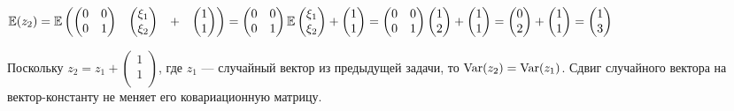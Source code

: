 \documentclass[pdftex,11pt,openany]{book}\usepackage[]{graphicx}\usepackage[]{color}
\begin{document}
\begin{solution}
$\mathbb{E} (z_2) = \mathbb{E}   \begin{pmatrix}
 \begin{pmatrix}
0 & 0 \\
0 & 1 \\
\end{pmatrix}  &  \begin{pmatrix}
\xi_1 \\
\xi_2 \\
\end{pmatrix}  & + &  \begin{pmatrix}
1\\
1\\
\end{pmatrix}  \\
\end{pmatrix}  =  \begin{pmatrix}
0 & 0 \\
0 & 1 \\
\end{pmatrix}  \mathbb{E}   \begin{pmatrix}
\xi_1 \\
\xi_2 \\
\end{pmatrix}  +  \begin{pmatrix}
1\\
1\\
\end{pmatrix}  =  \begin{pmatrix}
0 & 0 \\
0 & 1 \\
\end{pmatrix}   \begin{pmatrix}
1\\
2\\
\end{pmatrix}  +  \begin{pmatrix}
1\\
1\\
\end{pmatrix}  =  \begin{pmatrix}
0\\
2\\
\end{pmatrix} +  \begin{pmatrix}
1\\
1\\
\end{pmatrix}  =  \begin{pmatrix}
1\\
3\\
\end{pmatrix} $

Поскольку $z_2 = z_1 +  \begin{pmatrix}
1\\
1\\
\end{pmatrix} $, где $z_1$ --- случайный вектор из предыдущей задачи, то $\operatorname{Var} (z_2) = \operatorname{Var} (z_1)$. Сдвиг случайного вектора на вектор-константу не меняет его ковариационную матрицу. 
\end{solution}
\end{document}
